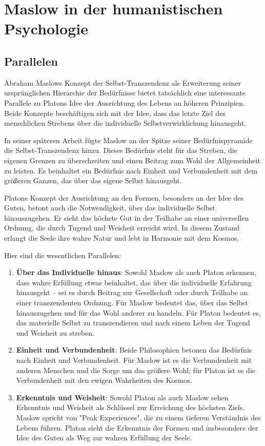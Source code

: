 \documentclass[12pt,a4paper]{article}
\begin{document}
\section{Maslow in der humanistischen Psychologie}
\subsection[short]{Parallelen}
Abraham Maslows Konzept der Selbst-Transzendenz als Erweiterung seiner ursprünglichen Hierarchie der Bedürfnisse bietet tatsächlich eine interessante Parallele zu Platons Idee der Ausrichtung des Lebens an höheren Prinzipien. Beide Konzepte beschäftigen sich mit der Idee, dass das letzte Ziel des menschlichen Strebens über die individuelle Selbstverwirklichung hinausgeht.

In seiner späteren Arbeit fügte Maslow an der Spitze seiner Bedürfnispyramide die Selbst-Transzendenz hinzu. Dieses Bedürfnis steht für das Streben, die eigenen Grenzen zu überschreiten und einen Beitrag zum Wohl der Allgemeinheit zu leisten. Es beinhaltet ein Bedürfnis nach Einheit und Verbundenheit mit dem größeren Ganzen, das über das eigene Selbst hinausgeht.

Platons Konzept der Ausrichtung an den Formen, besonders an der Idee des Guten, betont auch die Notwendigkeit, über das individuelle Selbst hinauszugehen. Er sieht das höchste Gut in der Teilhabe an einer universellen Ordnung, die durch Tugend und Weisheit erreicht wird. In diesem Zustand erlangt die Seele ihre wahre Natur und lebt in Harmonie mit dem Kosmos.

Hier sind die wesentlichen Parallelen:

\begin{enumerate}
    \item 
 \textbf{Über das Individuelle hinaus}: Sowohl Maslow als auch Platon erkennen, dass wahre Erfüllung etwas beinhaltet, das über die individuelle Erfahrung hinausgeht – sei es durch Beitrag zur Gesellschaft oder durch Teilhabe an einer transzendenten Ordnung. Für Maslow bedeutet das, über das Selbst hinauszugehen und für das
 Wohl anderer zu handeln. Für Platon bedeutet es, das materielle Selbst
 zu transzendieren und nach einem Leben der Tugend und Weisheit zu
 streben.

 \item
\textbf{Einheit und Verbundenheit}: Beide Philosophien betonen das Bedürfnis nach Einheit und Verbundenheit. Für Maslow ist es die Verbundenheit mit anderen Menschen und die Sorge um das größere Wohl; für Platon ist es die Verbundenheit mit den ewigen Wahrheiten des Kosmos.

\item
\textbf{Erkenntnis und Weisheit}: Sowohl Platon als auch Maslow sehen Erkenntnis und Weisheit als Schlüssel zur Erreichung des höchsten Ziels. Maslow spricht von "Peak Experiences", die zu einem tieferen Verständnis des Lebens führen. Platon sieht die Erkenntnis der Formen und insbesondere der Idee des Guten als Weg zur wahren Erfüllung der Seele.
\end{enumerate}
\end{document}
